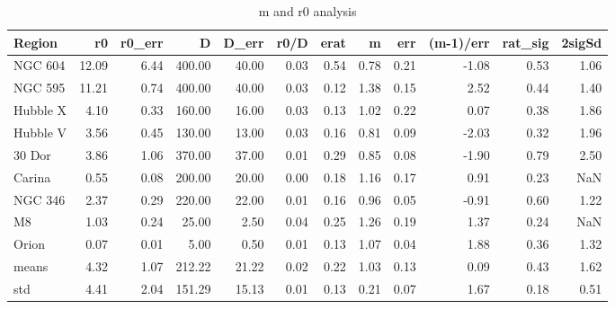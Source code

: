\begin{table}
\centering
\caption{m and r0 analysis}
\begin{tabular}{lrrrrrrrrrrr}
\toprule
   Region &     r0 &  r0_err &       D &  D_err &  r0/D &  erat &     m &   err &  (m-1)/err &  rat_sig &  2sigSd  \\
\midrule
  NGC 604 &  12.09 &    6.44 &  400.00 &  40.00 &  0.03 &  0.54 &  0.78 &  0.21 &      -1.08 &     0.53 &     1.06 \\
  NGC 595 &  11.21 &    0.74 &  400.00 &  40.00 &  0.03 &  0.12 &  1.38 &  0.15 &       2.52 &     0.44 &     1.40 \\
 Hubble X &   4.10 &    0.33 &  160.00 &  16.00 &  0.03 &  0.13 &  1.02 &  0.22 &       0.07 &     0.38 &     1.86 \\
 Hubble V &   3.56 &    0.45 &  130.00 &  13.00 &  0.03 &  0.16 &  0.81 &  0.09 &      -2.03 &     0.32 &     1.96 \\
   30 Dor &   3.86 &    1.06 &  370.00 &  37.00 &  0.01 &  0.29 &  0.85 &  0.08 &      -1.90 &     0.79 &     2.50 \\
   Carina &   0.55 &    0.08 &  200.00 &  20.00 &  0.00 &  0.18 &  1.16 &  0.17 &       0.91 &     0.23 &      NaN \\
  NGC 346 &   2.37 &    0.29 &  220.00 &  22.00 &  0.01 &  0.16 &  0.96 &  0.05 &      -0.91 &     0.60 &     1.22 \\
       M8 &   1.03 &    0.24 &   25.00 &   2.50 &  0.04 &  0.25 &  1.26 &  0.19 &       1.37 &     0.24 &      NaN \\
    Orion &   0.07 &    0.01 &    5.00 &   0.50 &  0.01 &  0.13 &  1.07 &  0.04 &       1.88 &     0.36 &     1.32 \\
    means &   4.32 &    1.07 &  212.22 &  21.22 &  0.02 &  0.22 &  1.03 &  0.13 &       0.09 &     0.43 &     1.62 \\
      std &   4.41 &    2.04 &  151.29 &  15.13 &  0.01 &  0.13 &  0.21 &  0.07 &       1.67 &     0.18 &     0.51 \\
\bottomrule
\end{tabular}
\end{table}
